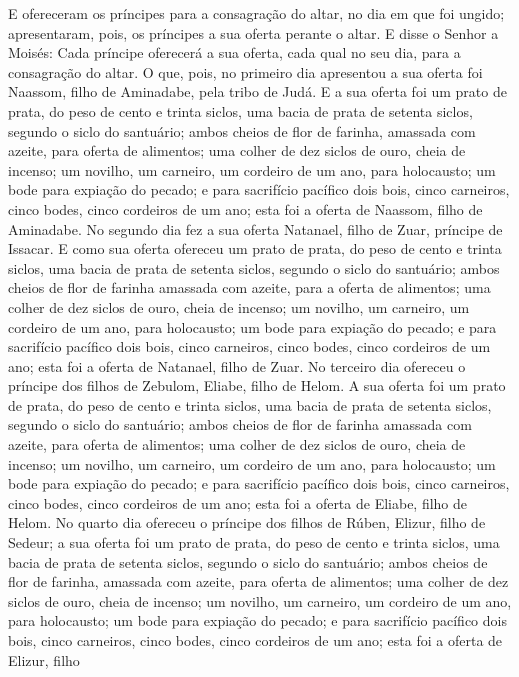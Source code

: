 E ofereceram os príncipes para a consagração do altar, no dia em
que foi ungido; apresentaram, pois, os príncipes a sua oferta
perante o altar. E disse o Senhor a Moisés: Cada príncipe
oferecerá a sua oferta, cada qual no seu dia, para a consagração do
altar. O que, pois, no primeiro dia apresentou a sua oferta
foi Naassom, filho de Aminadabe, pela tribo de Judá. E a sua
oferta foi um prato de prata, do peso de cento e trinta siclos, uma
bacia de prata de setenta siclos, segundo o siclo do santuário;
ambos cheios de flor de farinha, amassada com azeite, para oferta de
alimentos; uma colher de dez siclos de ouro, cheia de
incenso; um novilho, um carneiro, um cordeiro de um ano, para
holocausto; um bode para expiação do pecado; e para
sacrifício pacífico dois bois, cinco carneiros, cinco bodes, cinco
cordeiros de um ano; esta foi a oferta de Naassom, filho de
Aminadabe. No segundo dia fez a sua oferta Natanael, filho de
Zuar, príncipe de Issacar. E como sua oferta ofereceu um
prato de prata, do peso de cento e trinta siclos, uma bacia de prata
de setenta siclos, segundo o siclo do santuário; ambos cheios de
flor de farinha amassada com azeite, para a oferta de alimentos;
uma colher de dez siclos de ouro, cheia de incenso; um
novilho, um carneiro, um cordeiro de um ano, para holocausto;
um bode para expiação do pecado; e para sacrifício
pacífico dois bois, cinco carneiros, cinco bodes, cinco cordeiros de
um ano; esta foi a oferta de Natanael, filho de Zuar. No
terceiro dia ofereceu o príncipe dos filhos de Zebulom, Eliabe,
filho de Helom. A sua oferta foi um prato de prata, do peso
de cento e trinta siclos, uma bacia de prata de setenta siclos,
segundo o siclo do santuário; ambos cheios de flor de farinha
amassada com azeite, para oferta de alimentos; uma colher de
dez siclos de ouro, cheia de incenso; um novilho, um
carneiro, um cordeiro de um ano, para holocausto; um bode
para expiação do pecado; e para sacrifício pacífico dois
bois, cinco carneiros, cinco bodes, cinco cordeiros de um ano; esta
foi a oferta de Eliabe, filho de Helom. No quarto dia
ofereceu o príncipe dos filhos de Rúben, Elizur, filho de Sedeur;
a sua oferta foi um prato de prata, do peso de cento e trinta
siclos, uma bacia de prata de setenta siclos, segundo o siclo do
santuário; ambos cheios de flor de farinha, amassada com azeite,
para oferta de alimentos; uma colher de dez siclos de ouro,
cheia de incenso; um novilho, um carneiro, um cordeiro de um
ano, para holocausto; um bode para expiação do pecado;
e para sacrifício pacífico dois bois, cinco carneiros, cinco
bodes, cinco cordeiros de um ano; esta foi a oferta de Elizur, filho
